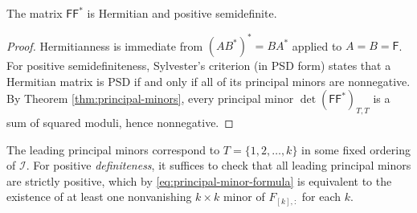 \documentclass[11pt]{amsart}
\begin{document}
\begin{cor}\label{cor:psd-sylvester}
The matrix $\mathsf{F} \mathsf{F}^*$ is Hermitian and positive semidefinite.
\end{cor}

\begin{proof}
Hermitianness is immediate from $(AB^*)^* = BA^*$ applied to $A = B = \mathsf{F}$. For positive semidefiniteness, Sylvester's criterion (in PSD form) states that a Hermitian matrix is PSD if and only if all of its principal minors are nonnegative. By Theorem \ref{thm:principal-minors}, every principal minor $\det(\mathsf{F} \mathsf{F}^*)_{T,T}$ is a sum of squared moduli, hence nonnegative.
\end{proof}

\begin{rem}
The leading principal minors correspond to $T = \{1, 2, \ldots, k\}$ in some fixed ordering of $\mathcal I$. For positive \emph{definiteness}, it suffices to check that all leading principal minors are strictly positive, which by \eqref{eq:principal-minor-formula} is equivalent to the existence of at least one nonvanishing $k\times k$ minor of $F_{[k], :}$ for each $k$.
\end{rem}
\end{document}

